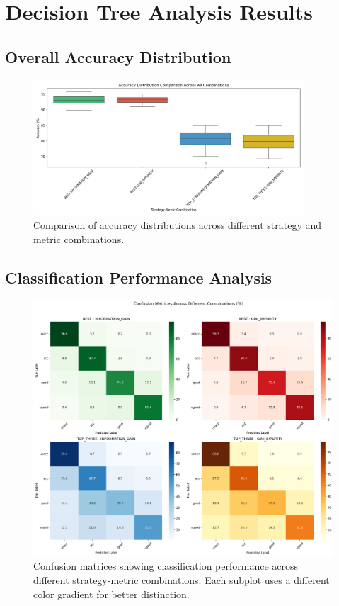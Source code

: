\documentclass[12pt]{article}
\begin{document}
\section{Decision Tree Analysis Results}

\subsection{Overall Accuracy Distribution}
\begin{figure}[H]
    \centering
    \includegraphics[width=0.9\textwidth]{plots/combined_accuracy_distribution.png}
    \caption{Comparison of accuracy distributions across different strategy and metric combinations.}
    \label{fig:combined-accuracy}
\end{figure}
\newpage

\subsection{Classification Performance Analysis}
\begin{figure}[H]
    \centering
    \includegraphics[width=\textwidth]{plots/confusion_matrices_combined.png}
    \caption{Confusion matrices showing classification performance across different strategy-metric combinations. Each subplot uses a different color gradient for better distinction.}
    \label{fig:confusion-matrices}
\end{figure}
\newpage
\end{document}
